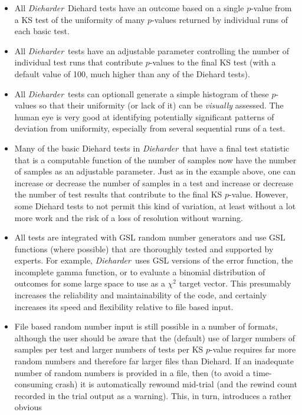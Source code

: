 \documentclass[12pt]{book}
\newcommand{\die}{\emph{Dieharder}\ }
\begin{document}
\begin{itemize}

 \item All \die Diehard tests have an outcome based on a single
$p$-value from a KS test of the uniformity of many $p$-values returned
by individual runs of each basic test.
 \item All \die tests have an adjustable parameter controlling the
number of individual test runs that contribute $p$-values to the final
KS test (with a default value of 100, much higher than any of the
Diehard tests).
 \item All \die tests can optionall generate a simple histogram of these
$p$-values so that their uniformity (or lack of it) can be {\em
visually} assessed.  The human eye is very good at identifying
potentially significant patterns of deviation from uniformity,
especially from several sequential runs of a test.
 \item Many of the basic Diehard tests in \die that have a final test
statistic that is a computable function of the number of samples now
have the number of samples as an adjustable parameter.  Just as in the
example above, one can increase or decrease the number of samples in a
test and increase or decrease the number of test results that contribute
to the final KS $p$-value.  However, some Diehard tests to not permit
this kind of variation, at least without a lot more work and the risk of
a loss of resolution without warning.
 \item All tests are integrated with GSL random number generators and
use GSL functions (where possible) that are thoroughly tested and
supported by experts. For example, \die uses GSL versions of the error
function, the incomplete gamma function, or to evaluate a binomial
distribution of outcomes for some large space to use as a $\chi^2$
target vector.  This presumably increases the reliability and
maintainability of the code, and certainly increases its speed and
flexibility relative to file based input.
 \item File based random number input is still possible in a number of
formats, although the user should be aware that the (default) use of
larger numbers of samples per test and larger numbers of tests per KS
$p$-value requires far more random numbers and therefore far larger
files than Diehard.  If an inadequate number of random numbers is
provided in a file, then (to avoid a time-consuming crash) it is
automatically rewound mid-trial (and the rewind count recorded in the
trial output as a warning).  This, in turn, introduces a rather obvious

\end{itemize}
\end{document}
